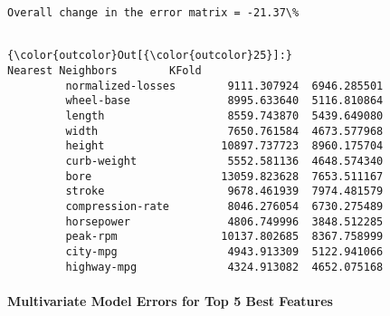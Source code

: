 \documentclass[11pt]{article}
\begin{document}
    \begin{Verbatim}[commandchars=\\\{\}]
Overall change in the error matrix = -21.37\%


    \end{Verbatim}

\begin{Verbatim}[commandchars=\\\{\}]
{\color{outcolor}Out[{\color{outcolor}25}]:}                    Nearest Neighbors        KFold
         normalized-losses        9111.307924  6946.285501
         wheel-base               8995.633640  5116.810864
         length                   8559.743870  5439.649080
         width                    7650.761584  4673.577968
         height                  10897.737723  8960.175704
         curb-weight              5552.581136  4648.574340
         bore                    13059.823628  7653.511167
         stroke                   9678.461939  7974.481579
         compression-rate         8046.276054  6730.275489
         horsepower               4806.749996  3848.512285
         peak-rpm                10137.802685  8367.758999
         city-mpg                 4943.913309  5122.941066
         highway-mpg              4324.913082  4652.075168
\end{Verbatim}
            
    \paragraph{Multivariate Model Errors for Top 5 Best
Features}\label{multivariate-model-errors-for-top-5-best-features}
\end{document}
